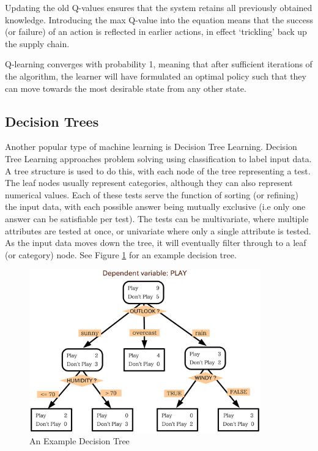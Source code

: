 \documentclass[a4paper,oneside]{report}
\begin{document}
Updating the old Q-values ensures that the system retains all previously obtained knowledge. Introducing the max Q-value into the equation means that the success (or failure) of an action is reflected in earlier actions, in effect `trickling' back up the supply chain.

Q-learning converges with probability 1, meaning that after sufficient iterations of the algorithm, the learner will have formulated an optimal policy such that they can move towards the most desirable state from any other state.

\subsection{Decision Trees}

Another popular type of machine learning is Decision Tree Learning. Decision Tree Learning approaches problem solving using classification to label input data. A tree structure is used to do this, with each node of the tree representing a test. The leaf nodes usually represent categories, although they can also represent numerical values. Each of these tests serve the function of sorting (or refining) the input data, with each possible answer being mutually exclusive (i.e only one answer can be satisfiable per test). The tests can be multivariate, where multiple attributes are tested at once, or univariate where only a single attribute is tested. As the input data moves down the tree, it will eventually filter through to a leaf (or category) node. See Figure \ref{fig:DecisionTree} for an example decision tree.

\begin{figure}[h!]
	\centering
		\includegraphics[width=100mm]{sources/images/DecisionTree}
    	\caption{An Example Decision Tree \cite{Koboldt:kx}}
    	\label{fig:DecisionTree}
\end{figure}
\end{document}
